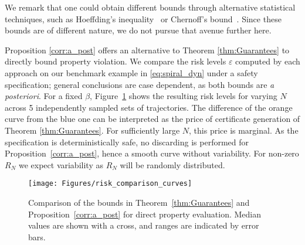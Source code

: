 We remark that one could obtain  different bounds through alternative statistical techniques, such as Hoeffding's inequality~\cite{Hoeffding01031963} or Chernoff's bound~\cite{10.1214/aoms/1177729330}. 
Since these bounds are of different nature, we do not pursue that avenue further here.




Proposition \ref{corr:a_post} offers an alternative to Theorem \ref{thm:Guarantees} to directly bound property violation. 
We compare the risk levels $\varepsilon$ computed by each approach on our benchmark example in \eqref{eq:spiral_dyn} under a safety specification; general conclusions are case dependent, as both bounds are \emph{a posteriori}.
For a fixed $\beta$, Figure~\ref{fig:bounds} shows the resulting risk levels for varying $N$ across 5 independently sampled sets of trajectories.
The difference of the orange curve from the blue one can be interpreted as the price of certificate generation of Theorem \ref{thm:Guarantees}. For sufficiently large $N$, this price is marginal.  
As the specification is deterministically safe, no discarding is performed for Proposition~\ref{corr:a_post}, hence a smooth curve without variability. 
For non-zero $R_N$ we expect variability as $R_N$ will be randomly distributed. 
\begin{figure}
    \centering
    \texttt{[image: Figures/risk\_comparison\_curves]}
    \caption{Comparison of the bounds in Theorem~\ref{thm:Guarantees} and Proposition~\ref{corr:a_post} for direct property evaluation. Median values are shown with a cross, and ranges are indicated by error bars.}
    \label{fig:bounds}
\end{figure}


